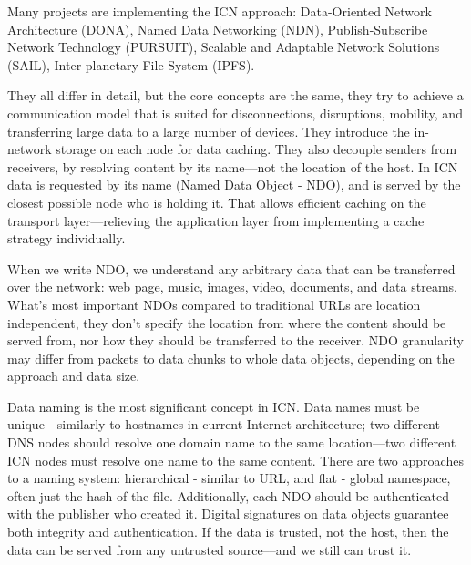 \documentclass[nostrict]{szablonPG}
\begin{document}
Many projects are implementing the ICN approach: Data-Oriented Network Architecture (DONA), Named Data Networking (NDN), Publish-Subscribe Network Technology (PURSUIT), Scalable and Adaptable Network Solutions (SAIL), Inter-planetary File System (IPFS).

They all differ in detail, but the core concepts are the same, they try to achieve a communication model that is suited for disconnections, disruptions, mobility, and transferring large data to a large number of devices. They introduce the in-network storage on each node for data caching. They also decouple senders from receivers, by resolving content by its name---not the location of the host. 
In ICN data is requested by its name (Named Data Object - NDO), and is served by the closest possible node who is holding it. That allows efficient caching on the transport layer---relieving the application layer from implementing a cache strategy individually. 

When we write NDO, we understand any arbitrary data that can be transferred over the network: web page, music, images, video, documents, and data streams. What's most important NDOs compared to traditional URLs are location independent, they don't specify the location from where the content should be served from, nor how they should be transferred to the receiver. NDO granularity may differ from packets to data chunks to whole data objects, depending on the approach and data size.

Data naming is the most significant concept in ICN. Data names must be unique––similarly to hostnames in current Internet architecture; two different DNS nodes should resolve one domain name to the same location––two different ICN nodes must resolve one name to the same content. 
There are two approaches to a naming system: hierarchical - similar to URL, and flat - global namespace, often just the hash of the file.
Additionally, each NDO should be authenticated with the publisher who created it. Digital signatures on data objects guarantee both integrity and authentication. If the data is trusted, not the host, then the data can be served from any untrusted source––and we still can trust it.
\end{document}
